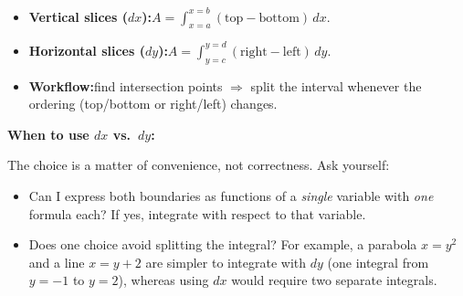 \begin{keyformula}[title={Key Formula: Area Between Curves (Choose $dx$ or $dy$)}]
\begin{itemize}[leftmargin=*]
\item \textbf{Vertical slices ($dx$):}\quad $A=\displaystyle\int_{x=a}^{x=b}(\text{top}-\text{bottom})\,dx$.
\item \textbf{Horizontal slices ($dy$):}\quad $A=\displaystyle\int_{y=c}^{y=d}(\text{right}-\text{left})\,dy$.
\item \textbf{Workflow:}\quad find intersection points $\Rightarrow$ split the interval whenever the ordering (top/bottom or right/left) changes.
\end{itemize}
\end{keyformula}

\textbf{When to use $dx$ vs.\ $dy$:}

The choice is a matter of convenience, not correctness. Ask yourself:
\begin{itemize}[leftmargin=*]
\item Can I express both boundaries as functions of a \emph{single} variable with \emph{one} formula each? If yes, integrate with respect to that variable.
\item Does one choice avoid splitting the integral? For example, a parabola $x=y^2$ and a line $x=y+2$ are simpler to integrate with $dy$ (one integral from $y=-1$ to $y=2$), whereas using $dx$ would require two separate integrals.
\end{itemize}


\begin{center}
\end{center}

